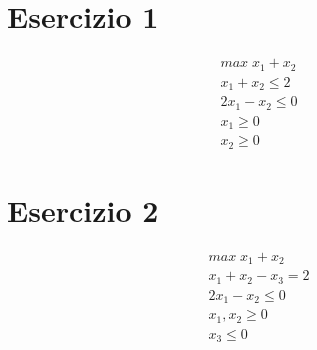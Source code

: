 \section{Esercizio 1}

\begin{align}
    \text{$max \; x_1 + x_2$} \\
    \text{$x_1 + x_2 \leq 2$} \\
    \text{$2 x_1 - x_2 \leq 0$} \\
    \text{$x_1 \geq 0$} \\
    \text{$x_2 \geq 0$}
\end{align}

\section{Esercizio 2}

\begin{align}
    \text{$max \; x_1 + x_2$} \\
    \text{$x_1 + x_2 - x_3 = 2$} \\
    \text{$2 x_1 - x_2 \leq 0$} \\
    \text{$x_1, x_2 \geq 0$} \\
    \text{$x_3 \leq 0$}
\end{align}

